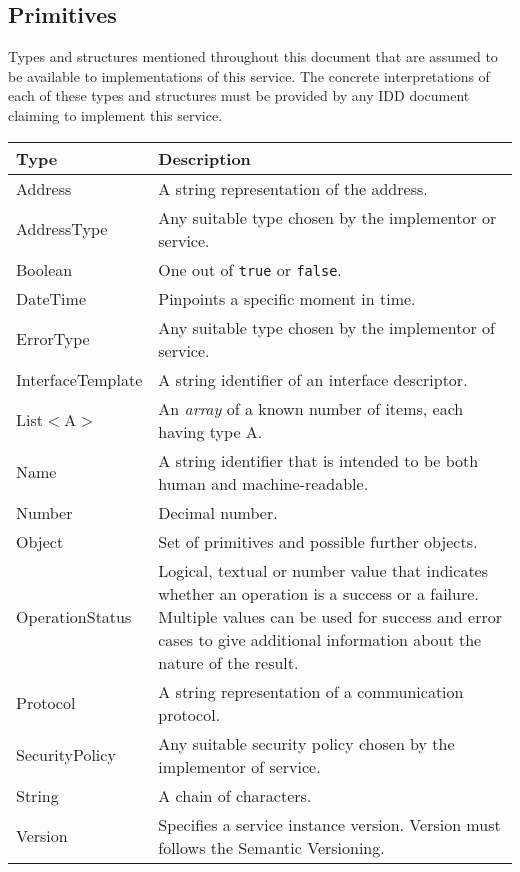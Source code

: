 \documentclass[a4paper]{arrowhead}
\newcommand{\pdef}[1]{{\textcolor{ArrowheadGrey}{#1\label{sec:model:primitives:#1}\label{sec:model:primitives:#1s}\label{sec:model:primitives:#1es}}}}
\begin{document}
\subsection{Primitives}
\label{sec:model:primitives}

Types and structures mentioned throughout this document that are assumed to be available to implementations of this service.
The concrete interpretations of each of these types and structures must be provided by any IDD document claiming to implement this service.


\begin{table}[ht!]
\begin{tabularx}{\textwidth}{| p{3cm} | X |} \hline
\rowcolor{gray!33} Type & Description \\ \hline
\pdef{Address}          & A string representation of the address. \\ \hline
\pdef{AddressType}      & Any suitable type chosen by the implementor or service. \\ \hline
\pdef{Boolean}          & One out of \texttt{true} or \texttt{false}. \\ \hline
\pdef{DateTime}         & Pinpoints a specific moment in time. \\ \hline
\pdef{ErrorType}        & Any suitable type chosen by the implementor of service. \\ \hline
\pdef{InterfaceTemplate} & A string identifier of an interface descriptor. \\ \hline
\pdef{List}$<$A$>$      & An \textit{array} of a known number of items, each having type A. \\ \hline
\pdef{Name}             & A string identifier that is intended to be both human and machine-readable. \\ \hline
\pdef{Number}           & Decimal number. \\ \hline
\pdef{Object}           & Set of primitives and possible further objects. \\ \hline
\pdef{OperationStatus}  & Logical, textual or number value that indicates whether an operation is a success or a failure. Multiple values can be used for success and error cases to give additional information about the nature of the result. \\ \hline
\pdef{Protocol}         & A string representation of a communication protocol. \\ \hline
\pdef{SecurityPolicy}   & Any suitable security policy chosen by the implementor of service. \\ \hline
\pdef{String}           & A chain of characters. \\ \hline
\pdef{Version}          & Specifies a service instance version. Version must follows the Semantic Versioning. \\ \hline
\end{tabularx}
\end{table}
\end{document}
